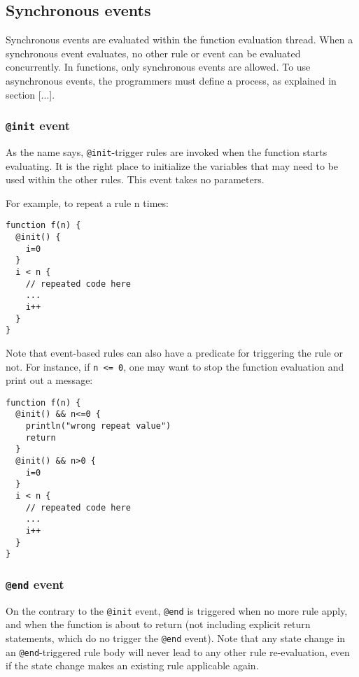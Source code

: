 \documentclass[11pt]{article}
\begin{document}
\subsection{Synchronous events}

Synchronous events are evaluated within the function evaluation thread. When a synchronous event evaluates, no other rule or event can be evaluated concurrently. In functions, only synchronous events are allowed. To use asynchronous events, the programmers must define a process, as explained in section [...].

\subsubsection{\texttt{@init} event}

As the name says, \texttt{@init}-trigger rules are invoked when the function starts evaluating. It is the right place to initialize the variables that may need to be used within the other rules. This event takes no parameters.

For example, to repeat a rule n times:

\begin{lstlisting}
function f(n) {
  @init() {
    i=0
  }
  i < n {
    // repeated code here
    ...
    i++
  }
}
\end{lstlisting}

Note that event-based rules can also have a predicate for triggering the rule or not. For instance, if \texttt{n <= 0}, one may want to stop the function evaluation and print out a message:

\begin{lstlisting}
function f(n) {
  @init() && n<=0 {
    println("wrong repeat value")
    return
  }
  @init() && n>0 {
    i=0
  }
  i < n {
    // repeated code here
    ...
    i++
  }
}
\end{lstlisting}

\subsubsection{\texttt{@end} event}

On the contrary to the \texttt{@init} event, \texttt{@end} is triggered when no more rule apply, and when the function is about to return (not including explicit return statements, which do no trigger the \texttt{@end} event). Note that any state change in an \texttt{@end}-triggered rule body will never lead to any other rule re-evaluation, even if the state change makes an existing rule applicable again.
\end{document}
